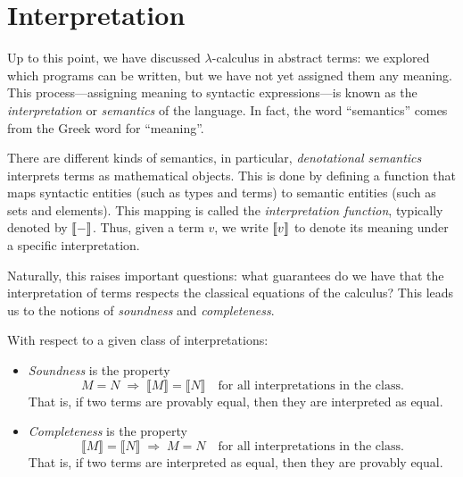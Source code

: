  

 










\section{Interpretation} \label{sec: Lambda Calculus:Interpretation}


Up to this point, we have discussed $\lambda$-calculus in abstract terms: we explored which programs can be written, but we have not yet assigned them any meaning. This process—assigning meaning to syntactic expressions—is known as the \emph{interpretation} or \emph{semantics} of the language. In fact, the word ``semantics'' comes from the Greek word for ``meaning''.

There are different kinds of semantics, in particular, \emph{denotational semantics} interprets terms as mathematical objects. This is done by defining a function that maps syntactic entities (such as types and terms) to semantic entities (such as sets and elements). This mapping is called the \emph{interpretation function}, typically denoted by $\left \llbracket - \right \rrbracket$. Thus, given a term $v$, we write $\left \llbracket v \right \rrbracket$ to denote its meaning under a specific interpretation.

Naturally, this raises important questions: what guarantees do we have that the interpretation of terms respects the classical equations of the calculus? This leads us to the notions of \emph{soundness} and \emph{completeness}.

With respect to a given class of interpretations:
\begin{itemize}
  \item \emph{Soundness} is the property 
  \[
  M = N \;\Rightarrow\; \llbracket M \rrbracket = \llbracket N \rrbracket
  \quad \text{for all interpretations in the class.}
  \]
  That is, if two terms are provably equal, then they are interpreted as equal.
  
  \item \emph{Completeness} is the property 
  \[
  \llbracket M \rrbracket = \llbracket N \rrbracket
  \;\Rightarrow\; M = N
  \quad \text{for all interpretations in the class.}
  \]
  That is, if two terms are interpreted as equal, then they are provably equal.
\end{itemize}

